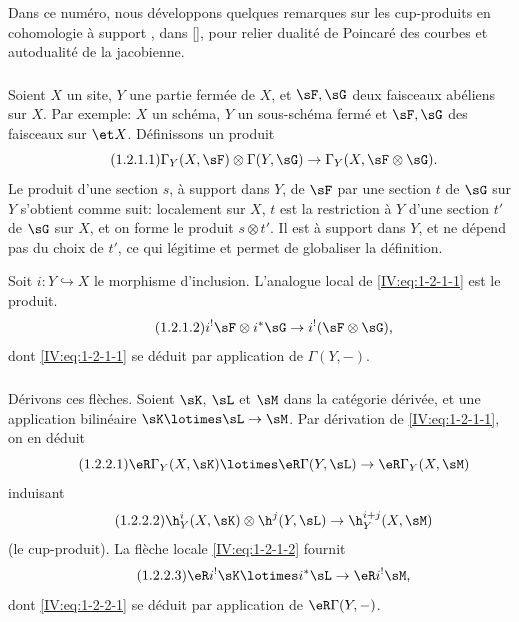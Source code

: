 Dans ce numéro, nous développons quelques remarques sur les cup-produits en 
cohomologie à support , dans [], pour relier 
dualité de Poincaré des courbes et autodualité de la jacobienne.

\subsubsection{}\label{IV:1-2-1}

Soient $X$ un site, $Y$ une partie fermée de $X$, et $\sF,\sG$ deux faisceaux 
abéliens sur $X$. Par exemple: $X$ un schéma, $Y$ un sous-schéma fermé 
et $\sF,\sG$ des faisceaux sur $\et X$. Définissons un produit 
\begin{equation*}\tag{1.2.1.1}\label{IV:eq:1-2-1-1}
  \Gamma_Y(X,\sF)\otimes \Gamma(Y,\sG) \to \Gamma_Y(X,\sF\otimes\sG) \text{.}
\end{equation*}
Le produit d'une section $s$, à support dans $Y$, de $\sF$ par une section 
$t$ de $\sG$ sur $Y$ s'obtient comme suit: localement sur $X$, $t$ est la 
restriction à $Y$ d'une section $t'$ de $\sG$ sur $X$, et on forme le produit 
$s\otimes t'$. Il est à support dans $Y$, et ne dépend pas du choix de 
$t'$, ce qui légitime et permet de globaliser la définition.

Soit $i:Y\hookrightarrow X$ le morphisme d'inclusion. L'analogue local de 
\eqref{IV:eq:1-2-1-1} est le produit.
\begin{equation*}\tag{1.2.1.2}\label{IV:eq:1-2-1-2}
  i^!\sF\otimes i^*\sG \to i^!(\sF\otimes\sG) \text{,}
\end{equation*}
dont \eqref{IV:eq:1-2-1-1} se déduit par application de $\Gamma(Y,-)$. 





\subsubsection{}\label{IV:1-2-2}

Dérivons ces flèches. Soient $\sK$, $\sL$ et $\sM$ dans la catégorie 
dérivée, et une application bilinéaire $\sK\lotimes\sL\to\sM$. Par 
dérivation de \eqref{IV:eq:1-2-1-1}, on en déduit 
\begin{equation*}\tag{1.2.2.1}\label{IV:eq:1-2-2-1}
  \eR\Gamma_Y(X,\sK) \lotimes \eR\Gamma(Y,\sL) \to \eR\Gamma_Y(X,\sM) 
\end{equation*}
induisant 
\begin{equation*}\tag{1.2.2.2}\label{IV:eq:1-2-2-2}
  \h_Y^i(X,\sK)\otimes \h^j(Y,\sL) \to \h_Y^{i+j}(X,\sM)
\end{equation*}
(le cup-produit). La flèche locale \eqref{IV:eq:1-2-1-2} fournit 
\begin{equation*}\tag{1.2.2.3}\label{IV:eq:1-2-2-3}
  \eR i^! \sK\lotimes i^*\sL \to \eR i^!\sM \text{,}
\end{equation*}
dont \eqref{IV:eq:1-2-2-1} se déduit par application de $\eR\Gamma(Y,-)$. 





